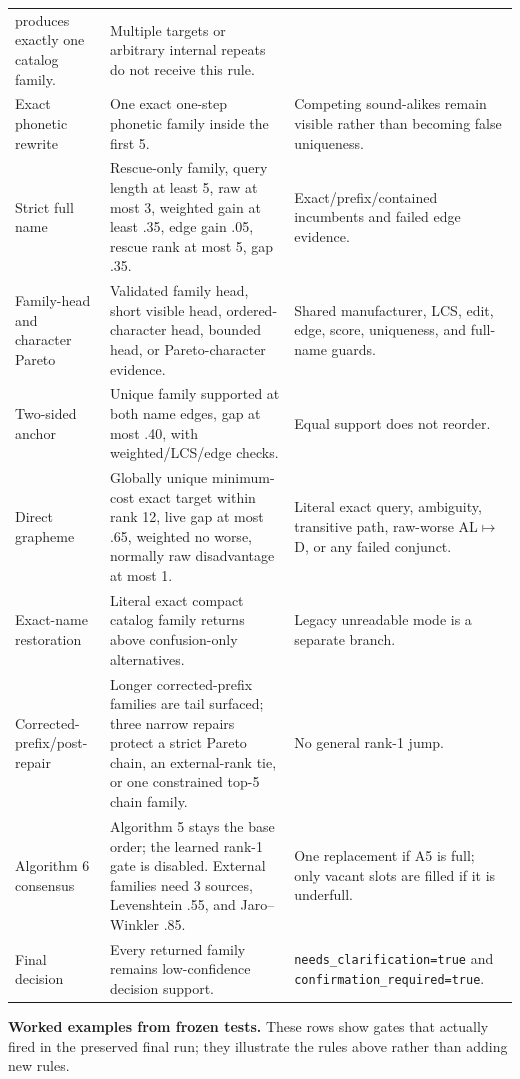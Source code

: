 \documentclass[10pt,a4paper]{article}
\begin{document}
\begin{longtable}{@{}L{38mm}L{74mm}L{54mm}@{}}
produces exactly one catalog family. & Multiple targets or arbitrary internal
repeats do not receive this rule. \\
Exact phonetic rewrite & One exact one-step phonetic family inside the first 5. &
Competing sound-alikes remain visible rather than becoming false uniqueness. \\
Strict full name & Rescue-only family, query length at least 5, raw at most 3,
weighted gain at least .35, edge gain .05, rescue rank at most 5, gap .35. &
Exact/prefix/contained incumbents and failed edge evidence. \\
Family-head and character Pareto & Validated family head, short visible head,
ordered-character head, bounded head, or Pareto-character evidence. & Shared
manufacturer, LCS, edit, edge, score, uniqueness, and full-name guards. \\
Two-sided anchor & Unique family supported at both name edges, gap at most .40,
with weighted/LCS/edge checks. & Equal support does not reorder. \\
Direct grapheme & Globally unique minimum-cost exact target within rank 12,
live gap at most .65, weighted no worse, normally raw disadvantage at most 1. &
Literal exact query, ambiguity, transitive path, raw-worse AL$\mapsto$D, or any
failed conjunct. \\
Exact-name restoration & Literal exact compact catalog family returns above
confusion-only alternatives. & Legacy unreadable mode is a separate branch. \\
Corrected-prefix/post-repair & Longer corrected-prefix families are tail
surfaced; three narrow repairs protect a strict Pareto chain, an external-rank
tie, or one constrained top-5 chain family. & No general rank-1 jump. \\
Algorithm 6 consensus & Algorithm 5 stays the base order; the learned rank-1
gate is disabled. External families need 3 sources, Levenshtein .55, and
Jaro--Winkler .85. & One replacement if A5 is full; only vacant slots are
filled if it is underfull. \\
Final decision & Every returned family remains low-confidence decision support. &
\texttt{needs\_clarification=true} and \texttt{confirmation\_required=true}. \\
\bottomrule
\end{longtable}

\Needspace{.38\textheight}
\textbf{Worked examples from frozen tests.} These rows show gates that actually
fired in the preserved final run; they illustrate the rules above rather than
adding new rules.
\end{document}
